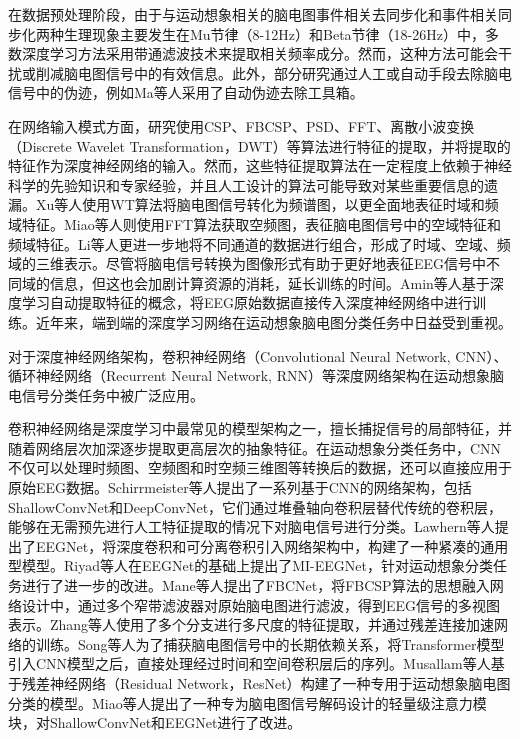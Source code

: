 在数据预处理阶段，由于与运动想象相关的脑电图事件相关去同步化和事件相关同步化两种生理现象主要发生在Mu节律（8-12Hz）和Beta节律（18-26Hz）中\cite{altaheri2023deep}，多数深度学习方法采用带通滤波技术来提取相关频率成分。然而，这种方法可能会干扰或削减脑电图信号中的有效信息。此外，部分研究通过人工或自动手段去除脑电信号中的伪迹，例如Ma等人\cite{ma2019deep}采用了自动伪迹去除工具箱\cite{gomez2006automatic}。

在网络输入模式方面，研究\cite{luo2018exploring,olivas2019classification,she2019hierarchical,ma2020dwt,chu2018decoding,hassanpour2019novel}使用CSP、FBCSP、PSD、FFT、离散小波变换（Discrete Wavelet Transformation，DWT）等算法进行特征的提取，并将提取的特征作为深度神经网络的输入。然而，这些特征提取算法在一定程度上依赖于神经科学的先验知识和专家经验，并且人工设计的算法可能导致对某些重要信息的遗漏。Xu等人\cite{xu2018wavelet}使用WT算法将脑电图信号转化为频谱图，以更全面地表征时域和频域特征。Miao等人\cite{miao2020spatial}则使用FFT算法获取空频图，表征脑电图信号中的空域特征和频域特征。Li等人\cite{li2020novel}更进一步地将不同通道的数据进行组合，形成了时域、空域、频域的三维表示。尽管将脑电信号转换为图像形式有助于更好地表征EEG信号中不同域的信息，但这也会加剧计算资源的消耗，延长训练的时间。Amin\cite{amin2019deep}等人基于深度学习自动提取特征的概念，将EEG原始数据直接传入深度神经网络中进行训练。近年来，端到端的深度学习网络在运动想象脑电图分类任务中日益受到重视。

对于深度神经网络架构，卷积神经网络（Convolutional Neural Network, CNN）、循环神经网络（Recurrent Neural Network, RNN）等深度网络架构在运动想象脑电信号分类任务中被广泛应用。

卷积神经网络是深度学习中最常见的模型架构之一，擅长捕捉信号的局部特征，并随着网络层次加深逐步提取更高层次的抽象特征。在运动想象分类任务中，CNN不仅可以处理时频图、空频图和时空频三维图等转换后的数据，还可以直接应用于原始EEG数据。Schirrmeister等人\cite{schirrmeister2017deep}提出了一系列基于CNN的网络架构，包括ShallowConvNet和DeepConvNet，它们通过堆叠轴向卷积层替代传统的卷积层，能够在无需预先进行人工特征提取的情况下对脑电信号进行分类。Lawhern等人\cite{lawhern2018eegnet}提出了EEGNet，将深度卷积和可分离卷积引入网络架构中，构建了一种紧凑的通用型模型。Riyad等人\cite{riyad2021mi}在EEGNet的基础上提出了MI-EEGNet，针对运动想象分类任务进行了进一步的改进。Mane等人\cite{mane2021fbcnet}提出了FBCNet，将FBCSP算法的思想融入网络设计中，通过多个窄带滤波器对原始脑电图进行滤波，得到EEG信号的多视图表示。Zhang等人\cite{zhang2021eeg}使用了多个分支进行多尺度的特征提取，并通过残差连接加速网络的训练。Song等人\cite{song2022eeg}为了捕获脑电图信号中的长期依赖关系，将Transformer\cite{vaswani2017attention}模型引入CNN模型之后，直接处理经过时间和空间卷积层后的序列。Musallam等人\cite{musallam2021electroencephalography}基于残差神经网络（Residual Network，ResNet）\cite{he2016deep}构建了一种专用于运动想象脑电图分类的模型。Miao等人\cite{miao2023lmda}提出了一种专为脑电图信号解码设计的轻量级注意力模块，对ShallowConvNet和EEGNet进行了改进。

